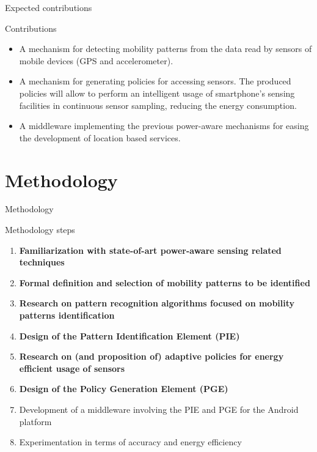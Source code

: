 \documentclass[8pt,xcolor={dvipsnames},handout]{beamer}
\begin{document}
\begin{frame}{Expected contributions}
\begin{exampleblock}{Contributions}
\begin{itemize}
  \item<+-> A mechanism for detecting mobility patterns from the data read by sensors of mobile devices (GPS and accelerometer).
  \item<+-> A mechanism for generating policies for accessing sensors.
  The produced policies will allow to perform an intelligent usage of smartphone's sensing facilities in continuous sensor sampling, reducing the energy consumption.
  \item<+-> A middleware implementing the previous power-aware mechanisms for easing the development of location based services.
\end{itemize}
\end{exampleblock}
\end{frame}

\section{Methodology}
\begin{frame}{Methodology}
\begin{exampleblock}{Methodology steps}
\begin{enumerate}
  \item \textbf{Familiarization with state-of-art power-aware sensing related techniques}
  \item \textbf{Formal definition and selection of mobility patterns to be identified}
  \item \textbf{Research on pattern recognition algorithms focused on mobility patterns identification}
  \item \textbf{Design of the Pattern Identification Element (PIE)}
  \item \textbf{Research on (and proposition of) adaptive policies for energy efficient usage of sensors}
  \item \textbf{Design of the Policy Generation Element (PGE)}
  \item Development of a middleware involving the PIE and PGE for the Android platform
  \item Experimentation in terms of accuracy and energy efficiency
\end{enumerate}
\end{exampleblock}
\end{frame}
\end{document}
